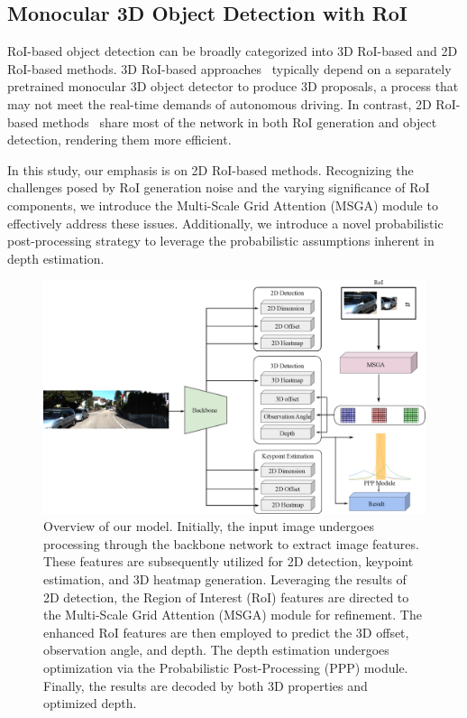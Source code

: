 \documentclass[journal]{IEEEtran}
\begin{document}
	\subsection{Monocular 3D Object Detection with RoI}
	
	RoI-based object detection can be broadly categorized into 3D RoI-based and 2D RoI-based methods. 3D RoI-based approaches~\cite{neurocs, monoxiver} typically depend on a separately pretrained monocular 3D object detector to produce 3D proposals, a process that may not meet the real-time demands of autonomous driving. In contrast, 2D RoI-based methods~\cite{roi10d, didm3d, gupnet, gupnet++} share most of the network in both RoI generation and object detection, rendering them more efficient.
	
	In this study, our emphasis is on 2D RoI-based methods. Recognizing the challenges posed by RoI generation noise and the varying significance of RoI components, we introduce the Multi-Scale Grid Attention (MSGA) module to effectively address these issues. Additionally, we introduce a novel probabilistic post-processing strategy to leverage the probabilistic assumptions inherent in depth estimation.
	\begin{figure}[!t]
	\centering
	\includegraphics[width=1.0\linewidth]{Figures/overview/overview.eps}
	\caption{Overview of our model. Initially, the input image undergoes processing through the backbone network to extract image features. These features are subsequently utilized for 2D detection, keypoint estimation, and 3D heatmap generation. Leveraging the results of 2D detection, the Region of Interest (RoI) features are directed to the Multi-Scale Grid Attention (MSGA) module for refinement. The enhanced RoI features are then employed to predict the 3D offset, observation angle, and depth. The depth estimation undergoes optimization via the Probabilistic Post-Processing (PPP) module. Finally, the results are decoded by both 3D properties and optimized depth.}
	\label{fig:overview}
\end{figure}
	
\end{document}
